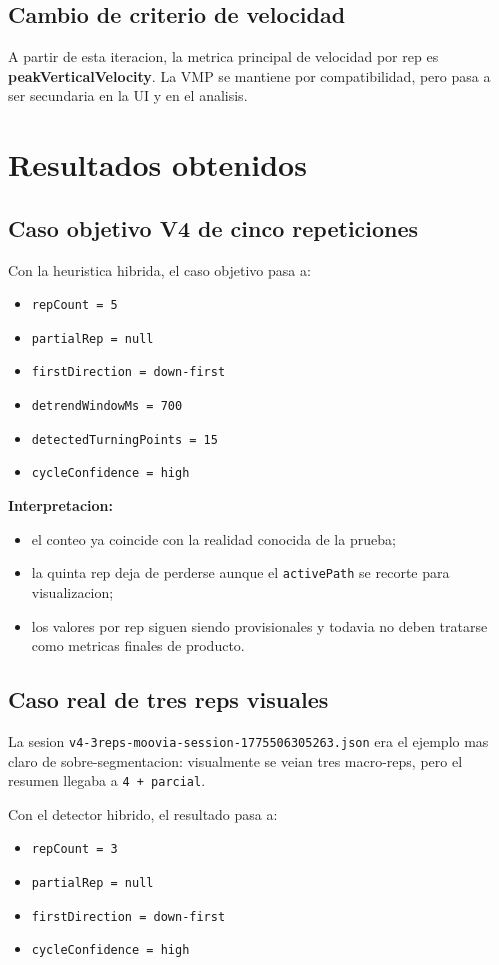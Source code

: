 ﻿\documentclass[11pt,a4paper]{article}
\begin{document}
\subsection*{Cambio de criterio de velocidad}
A partir de esta iteracion, la metrica principal de velocidad por rep es \textbf{peakVerticalVelocity}. La VMP se mantiene por compatibilidad, pero pasa a ser secundaria en la UI y en el analisis.

\section{Resultados obtenidos}
\subsection*{Caso objetivo V4 de cinco repeticiones}
Con la heuristica hibrida, el caso objetivo pasa a:
\begin{itemize}[leftmargin=14pt]
  \item \texttt{repCount = 5}
  \item \texttt{partialRep = null}
  \item \texttt{firstDirection = down-first}
  \item \texttt{detrendWindowMs = 700}
  \item \texttt{detectedTurningPoints = 15}
  \item \texttt{cycleConfidence = high}
\end{itemize}

\textbf{Interpretacion:}
\begin{itemize}[leftmargin=14pt]
  \item el conteo ya coincide con la realidad conocida de la prueba;
  \item la quinta rep deja de perderse aunque el \texttt{activePath} se recorte para visualizacion;
  \item los valores por rep siguen siendo provisionales y todavia no deben tratarse como metricas finales de producto.
\end{itemize}

\subsection*{Caso real de tres reps visuales}
La sesion \texttt{v4-3reps-moovia-session-1775506305263.json} era el ejemplo mas claro de sobre-segmentacion: visualmente se veian tres macro-reps, pero el resumen llegaba a \texttt{4 + parcial}.

Con el detector hibrido, el resultado pasa a:
\begin{itemize}[leftmargin=14pt]
  \item \texttt{repCount = 3}
  \item \texttt{partialRep = null}
  \item \texttt{firstDirection = down-first}
  \item \texttt{cycleConfidence = high}
\end{itemize}
\end{document}
